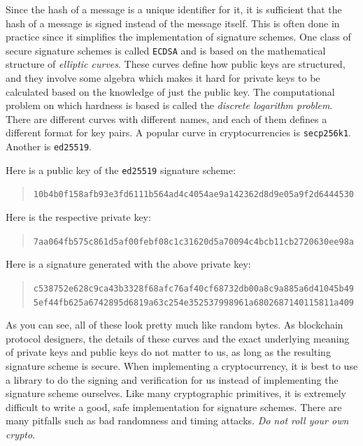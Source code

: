 Since the hash of a message is a unique identifier for it, it is sufficient that
the hash of a message is signed instead of the message itself. This is often done
in practice since it simplifies the implementation of signature schemes.
One class of secure signature schemes is called
\texttt{ECDSA} and is based on the mathematical structure of \emph{elliptic curves}.
These curves define how public keys are structured, and they involve some algebra
which makes it hard for private keys to be calculated based on the knowledge of
just the public key. The computational problem on which hardness is based is called
the \emph{discrete logarithm problem}.
There are different curves with different names, and each of them
defines a different format for key pairs.
A popular curve in cryptocurrencies is
\texttt{secp256k1}. Another is \texttt{ed25519}.

Here is a public key of the \texttt{ed25519} signature scheme:

\begin{quote}
\texttt{10b4b0f158afb93e3fd6111b564ad4c4054ae9a142362d8d9e05a9f2d6444530}
\end{quote}

Here is the respective private key:

\begin{quote}
\texttt{7aa064fb575c861d5af00febf08c1c31620d5a70094c4bcb11cb2720630ee98a}
\end{quote}

Here is a signature generated with the above private key:

\begin{quote}
\texttt{c538752e628c9ca43b3328f68afc76af40cf68732db00a8c9a885a6d41045b49}\linebreak
\texttt{5ef44fb625a6742895d6819a63c254e352537998961a6802687140115811a409}
\end{quote}

As you can see, all of these look pretty much like random bytes.
As blockchain protocol designers,
the details of these curves and the exact underlying meaning of private keys and public keys
do not matter to us, as long as the resulting signature
scheme is secure. When implementing a cryptocurrency, it is best to use a library
to do the signing and verification for us instead of implementing the signature
scheme ourselves. Like many cryptographic primitives, it is extremely difficult to
write a good, safe implementation for signature schemes. There are many pitfalls
such as bad randomness and timing attacks. \emph{Do not roll your own crypto.}

